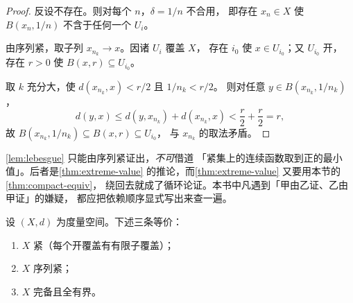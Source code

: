 \begin{proof}
  反设不存在。则对每个 \(n\)，\(\delta = 1/n\) 不合用，
  即存在 \(x_{n} \in X\) 使 \(B(x_{n},1/n)\) 不含于任何一个 \(U_{i}\)。

  由序列紧，取子列 \(x_{n_{k}} \to x\)。因诸 \(U_{i}\) 覆盖 \(X\)，
  存在 \(i_{0}\) 使 \(x \in U_{i_{0}}\)；又 \(U_{i_{0}}\) 开，
  存在 \(r>0\) 使 \(B(x,r) \subseteq U_{i_{0}}\)。

  取 \(k\) 充分大，使 \(d(x_{n_{k}},x) < r/2\) 且 \(1/n_{k} < r/2\)。
  则对任意 \(y \in B(x_{n_{k}},1/n_{k})\)，
  \begin{equation}
    \label{eq:lebesgue-est}
    d(y,x) \le d(y,x_{n_{k}}) + d(x_{n_{k}},x) < \frac{r}{2} + \frac{r}{2} = r ,
  \end{equation}
  故 \(B(x_{n_{k}},1/n_{k}) \subseteq B(x,r) \subseteq U_{i_{0}}\)，
  与 \(x_{n_{k}}\) 的取法矛盾。
\end{proof}

\begin{pitfall}
  \cref{lem:lebesgue} 只能由序列紧证出，\emph{不可}借道
  「紧集上的连续函数取到正的最小值」。后者是\cref{thm:extreme-value}
  的推论，而\cref{thm:extreme-value} 又要用本节的\cref{thm:compact-equiv}，
  绕回去就成了循环论证。本书中凡遇到「甲由乙证、乙由甲证」的嫌疑，
  都应把依赖顺序显式写出来查一遍。
\end{pitfall}

\begin{theorem}[三者等价]
  \label{thm:compact-equiv}
  设 \((X,d)\) 为度量空间。下述三条等价：
  \begin{enumerate}[label=(\roman*)]
    \item \(X\) 紧（每个开覆盖有有限子覆盖）；
    \item \(X\) 序列紧；
    \item \(X\) 完备且全有界。
  \end{enumerate}
\end{theorem}

